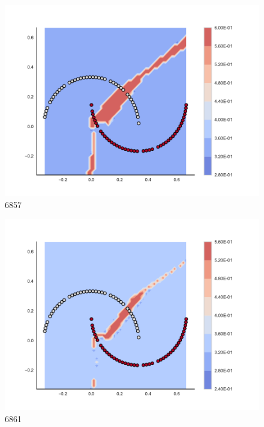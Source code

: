 \begin{subfigure}[b]{0.09\textwidth}
    \includegraphics[clip, trim=2.35cm 1.75cm 4.5cm 0cm,width=\textwidth]{img/convergence/6857.pdf}
    \caption{6857}
    \label{fig:convergence_6857}
\end{subfigure}
%
\begin{subfigure}[b]{0.09\textwidth}
    \includegraphics[clip, trim=2.35cm 1.75cm 4.5cm 0cm,width=\textwidth]{img/convergence/6861.pdf}
    \caption{6861}
    \label{fig:convergence_6861}
\end{subfigure}
%
